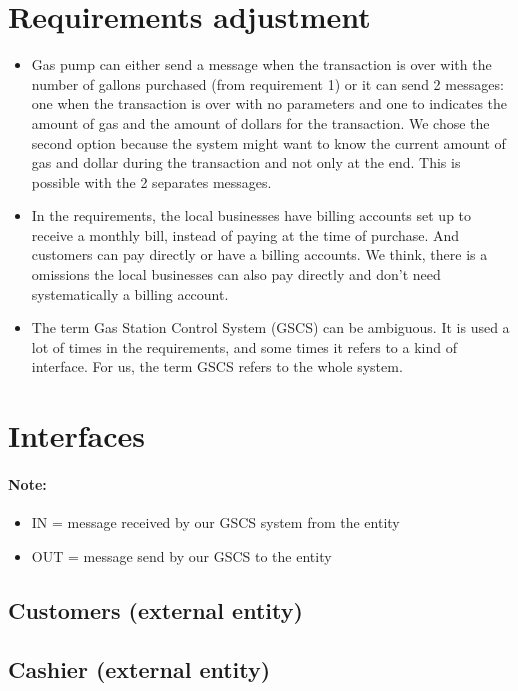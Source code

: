 \documentclass[11pt,a4paper]{article}
\begin{document}
\section{Requirements adjustment}
\begin{itemize}
	\item Gas pump can either send a message when the transaction is over with the number of gallons purchased (from requirement 1) or it can send 2 messages: one when the transaction is over with no parameters and one to indicates the amount of gas and the amount of dollars for the transaction.
We chose the second option because the system might want to know the current amount of gas and dollar during the transaction and not only at the end. This is possible with the 2 separates messages.
	\item In the requirements, the local businesses have billing accounts set up to receive a monthly bill, instead of paying at the time of purchase. And customers can pay directly or have a billing accounts. 
We think, there is a omissions the local businesses can also pay directly and don't need systematically a billing account.
	\item The term Gas Station Control System (GSCS) can be ambiguous. It is used a lot of times in the requirements, and some times it refers to a kind of interface. For us, the term GSCS refers to the whole system.
\end{itemize}


\section{Interfaces}

\paragraph{Note:}  
\begin{itemize}
\item IN = message received by our GSCS system from the entity
\item OUT = message send by our GSCS to the entity
\end{itemize}


\subsection{Customers (external entity)}
\subsection{Cashier (external entity)}
\end{document}
